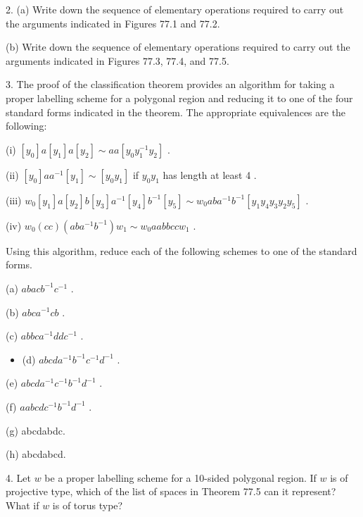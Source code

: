 \documentclass[10pt]{article}
\begin{document}
2. (a) Write down the sequence of elementary operations required to carry out the arguments indicated in Figures 77.1 and 77.2.

(b) Write down the sequence of elementary operations required to carry out the arguments indicated in Figures 77.3, 77.4, and 77.5.

3. The proof of the classification theorem provides an algorithm for taking a proper labelling scheme for a polygonal region and reducing it to one of the four standard forms indicated in the theorem. The appropriate equivalences are the following:

(i) \(\left\lbrack  {y}_{0}\right\rbrack  a\left\lbrack  {y}_{1}\right\rbrack  a\left\lbrack  {y}_{2}\right\rbrack   \sim  {aa}\left\lbrack  {{y}_{0}{y}_{1}^{-1}{y}_{2}}\right\rbrack\) .

(ii) \(\left\lbrack  {y}_{0}\right\rbrack  a{a}^{-1}\left\lbrack  {y}_{1}\right\rbrack   \sim  \left\lbrack  {{y}_{0}{y}_{1}}\right\rbrack\) if \({y}_{0}{y}_{1}\) has length at least 4 .

(iii) \({w}_{0}\left\lbrack  {y}_{1}\right\rbrack  a\left\lbrack  {y}_{2}\right\rbrack  b\left\lbrack  {y}_{3}\right\rbrack  {a}^{-1}\left\lbrack  {y}_{4}\right\rbrack  {b}^{-1}\left\lbrack  {y}_{5}\right\rbrack   \sim  {w}_{0}{ab}{a}^{-1}{b}^{-1}\left\lbrack  {{y}_{1}{y}_{4}{y}_{3}{y}_{2}{y}_{5}}\right\rbrack\) .

(iv) \({w}_{0}\left( {cc}\right) \left( {{ab}{a}^{-1}{b}^{-1}}\right) {w}_{1} \sim  {w}_{0}{aabbcc}{w}_{1}\) .

Using this algorithm, reduce each of the following schemes to one of the standard forms.

(a) \({abac}{b}^{-1}{c}^{-1}\) .

(b) \({abc}{a}^{-1}{cb}\) .

(c) \({abbc}{a}^{-1}{dd}{c}^{-1}\) .

\begin{itemize}\relax
\item\relax (d) \({abcd}{a}^{-1}{b}^{-1}{c}^{-1}{d}^{-1}\) .
\end{itemize}

(e) \({abcd}{a}^{-1}{c}^{-1}{b}^{-1}{d}^{-1}\) .

(f) \({aabcd}{c}^{-1}{b}^{-1}{d}^{-1}\) .

(g) abcdabdc.

(h) abcdabcd.

4. Let \(w\) be a proper labelling scheme for a 10-sided polygonal region. If \(w\) is of projective type, which of the list of spaces in Theorem 77.5 can it represent? What if \(w\) is of torus type?
\end{document}
